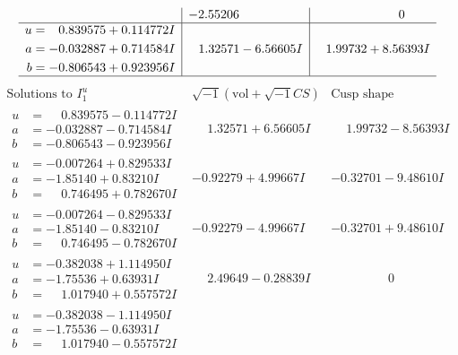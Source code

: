 \documentclass[1p]{elsarticle_modified}
\theoremstyle{definition}
\newcommand{\I}{\sqrt{-1}}
\begin{document}
$$\begin{array}{c|c|c}
 & -2.55206\phantom{ +0.000000I} & \phantom{-0.000000 } 0 \\ \hline\begin{aligned}
u &= \phantom{-}0.839575 + 0.114772 I \\
a &= -0.032887 + 0.714584 I \\
b &= -0.806543 + 0.923956 I\end{aligned}
 & \phantom{-}1.32571 - 6.56605 I & \phantom{-}1.99732 + 8.56393 I\\
 \hline 
 \end{array}$$\newpage$$\begin{array}{c|c|c}  
\text{Solutions to }I^u_{1}& \I (\text{vol} + \sqrt{-1}CS) & \text{Cusp shape}\\
 \hline 
\begin{aligned}
u &= \phantom{-}0.839575 - 0.114772 I \\
a &= -0.032887 - 0.714584 I \\
b &= -0.806543 - 0.923956 I\end{aligned}
 & \phantom{-}1.32571 + 6.56605 I & \phantom{-}1.99732 - 8.56393 I \\ \hline\begin{aligned}
u &= -0.007264 + 0.829533 I \\
a &= -1.85140 + 0.83210 I \\
b &= \phantom{-}0.746495 + 0.782670 I\end{aligned}
 & -0.92279 + 4.99667 I & -0.32701 - 9.48610 I \\ \hline\begin{aligned}
u &= -0.007264 - 0.829533 I \\
a &= -1.85140 - 0.83210 I \\
b &= \phantom{-}0.746495 - 0.782670 I\end{aligned}
 & -0.92279 - 4.99667 I & -0.32701 + 9.48610 I \\ \hline\begin{aligned}
u &= -0.382038 + 1.114950 I \\
a &= -1.75536 + 0.63931 I \\
b &= \phantom{-}1.017940 + 0.557572 I\end{aligned}
 & \phantom{-}2.49649 - 0.28839 I & \phantom{-0.000000 } 0 \\ \hline\begin{aligned}
u &= -0.382038 - 1.114950 I \\
a &= -1.75536 - 0.63931 I \\
b &= \phantom{-}1.017940 - 0.557572 I\end{aligned}

\end{array}$$
\end{document}
